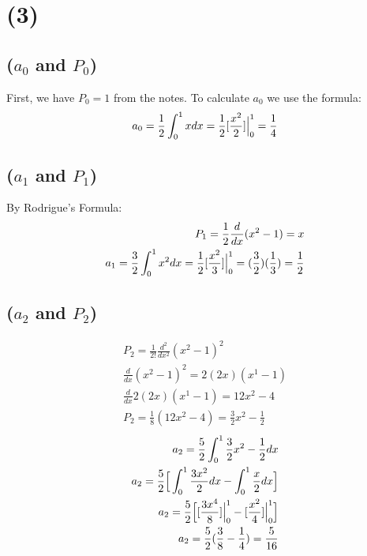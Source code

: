 \documentclass{article}
\begin{document}
\section*{\textbf{(3)}}
\subsection*{\textbf{($a_0$ and $P_0$)}}
First, we have $P_0=1$ from the notes. To calculate $a_0$ we use the formula:
\begin{equation}
\begin{aligned}
a_0 = \frac{1}{2}\int_0^1xdx = \frac{1}{2}[\frac{x^2}{2}]\Big{|}^1_0 = \frac{1}{4}
\end{aligned}
\end{equation}
\subsection*{\textbf{($a_1$ and $P_1$)}}
By Rodrigue's Formula:
\begin{equation}
\begin{aligned}
P_1 = \frac{1}{2}\frac{d}{dx}(x^2-1) = x\\
a_1 = \frac{3}{2}\int_0^1x^2dx = \frac{1}{2}[\frac{x^2}{3}]\Big{|}^1_0 = (\frac{3}{2})(\frac{1}{3}) = \frac{1}{2}
\end{aligned}
\end{equation}
\subsection*{\textbf{($a_2$ and $P_2$)}}
\begin{equation}
\begin{aligned}
P_2 = \frac{1}{2!}\frac{d^2}{dx^2}(x^2-1)^2\\
\frac{d}{dx}(x^2-1)^2 = 2(2x)(x^1-1) \\
\frac{d}{dx}2(2x)(x^1-1) = 12x^2-4\\
P_2 = \frac{1}{8}(12x^2-4) = \frac{3}{2}x^2 - \frac{1}{2}
\end{aligned}
\end{equation}
\begin{equation}
\begin{aligned}
a_2 = \frac{5}{2}\int_0^1\frac{3}{2}x^2 - \frac{1}{2}dx\\
a_2 = \frac{5}{2}\Big{[}\int_0^1\frac{3x^2}{2}dx - \int_0^1\frac{x}{2}dx \Big{]}\\
a_2 = \frac{5}{2}\Big{[}[\frac{3x^4}{8}]\Big{|}_0^1 - [\frac{x^2}{4}]\Big{|}_0^1 \Big{]}\\
a_2 = \frac{5}{2} (\frac{3}{8} - \frac{1}{4}) = \frac{5}{16}
\end{aligned}
\end{equation}
\end{document}
